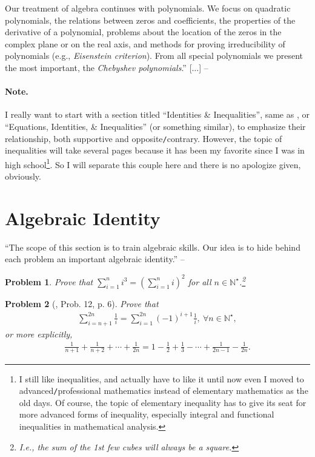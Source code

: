 \documentclass[oneside]{book}
\numberwithin{equation}{section}
\newtheorem{problem}{Problem}[section]
\begin{document}
Our treatment of algebra continues with polynomials. We focus on quadratic polynomials, the relations between zeros and coefficients, the properties of the derivative of a polynomial, problems about the location of the zeros in the complex plane or on the real axis, and methods for proving irreducibility of polynomials (e.g., \textit{Eisenstein criterion}). From all special polynomials we present the most important, the \textit{Chebyshev polynomials}.'' [$\ldots$] -- \cite[Chap. 2, p. 25]{Gelca_Andreescu2017}

\paragraph{Note.} I really want to start with a section titled ``Identities \& Inequalities'', same as \cite[Sect. 2.1]{Gelca_Andreescu2017}, or ``Equations, Identities, \& Inequalities'' (or something similar), to emphasize their relationship, both supportive and opposite\texttt{/}contrary. However, the topic of inequalities will take several pages because it has been my favorite since I was in high school\footnote{I still like inequalities, and actually have to like it until now even I moved to advanced\texttt{/}professional mathematics instead of elementary mathematics as the old days. Of course, the topic of elementary inequality has to give its seat for more advanced forms of inequality, especially integral and functional inequalities in mathematical analysis.}. So I will separate this couple here and there is no apologize given, obviously.

\section{Algebraic Identity}
``The scope of this section is to train algebraic skills. Our idea is to hide behind each problem an important algebraic identity.'' -- \cite[Subsect. 2.1.1, p. 25]{Gelca_Andreescu2017}

\begin{problem}
	Prove that $\sum_{i=1}^n i^3 = \left(\sum_{i=1}^n i\right)^2$ for all $n\in\mathbb{N}^\star$.\footnote{I.e., the sum of the 1st few cubes will always be a square.}
\end{problem}

\begin{problem}[\cite{Gelca_Andreescu2017}, Prob. 12, p. 6] Prove that
	\begin{align*}
		\sum_{i=n+1}^{2n} \frac{1}{i} = \sum_{i=1}^{2n} (-1)^{i+1}\frac{1}{i},\ \forall n\in\mathbb{N}^\star,
	\end{align*}
	or more explicitly,
	\begin{align*}
		\frac{1}{n + 1} + \frac{1}{n + 2} + \cdots + \frac{1}{2n} = 1 - \frac{1}{2} + \frac{1}{3} - \cdots + \frac{1}{2n - 1} - \frac{1}{2n}.
	\end{align*}
\end{problem}
\end{document}

